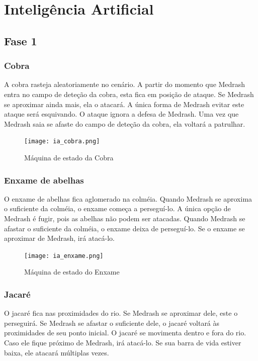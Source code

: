 \section{Inteligência Artificial}

\subsection{Fase 1}

\subsubsection{Cobra}

A cobra rasteja aleatoriamente no cenário. A partir do momento que
Medrash entra no campo de deteção da cobra, esta fica em posição
de ataque. Se Medrash se aproximar ainda mais, ela o atacará.
A única forma de Medrash evitar este ataque será esquivando. O ataque
ignora a defesa de Medrash.
Uma vez que Medrash saia se afaste do campo de deteção da cobra, ela
voltará a patrulhar.

\begin{figure}[!ht]
 \centering
 \texttt{[image: ia\_cobra.png]}
 \caption{Máquina de estado da Cobra}
 \label{fsm:cobra}
\end{figure}

\subsubsection{Enxame de abelhas}

O enxame de abelhas fica aglomerado na colméia. Quando Medrash se
aproxima o suficiente da colméia, o enxame começa a perseguí-lo.
A única opção de Medrash é fugir, pois as abelhas não podem ser atacadas.
Quando Medrash se afastar o suficiente da colméia, o enxame deixa
de perseguí-lo.
Se o enxame se aproximar de Medrash, irá atacá-lo.

\begin{figure}[!ht]
 \centering
 \texttt{[image: ia\_enxame.png]}
 \caption{Máquina de estado do Enxame}
 \label{fsm:enxame}
\end{figure}

\subsubsection{Jacaré}

O jacaré fica nas proximidades do rio. Se Medrash se aproximar dele,
este o perseguirá. Se Medrash se afastar o suficiente dele, o jacaré voltará às proximidades de seu ponto inicial.
O jacaré se movimenta dentro e fora do rio. Caso ele fique próximo de
Medrash, irá atacá-lo. Se sua barra de vida estiver baixa, ele atacará
múltiplas vezes.

